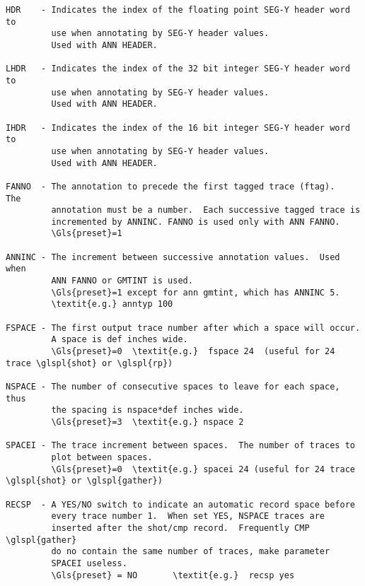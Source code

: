 \begin{verbatim}
HDR    - Indicates the index of the floating point SEG-Y header word to
         use when annotating by SEG-Y header values.
         Used with ANN HEADER.

LHDR   - Indicates the index of the 32 bit integer SEG-Y header word to
         use when annotating by SEG-Y header values.
         Used with ANN HEADER.

IHDR   - Indicates the index of the 16 bit integer SEG-Y header word to
         use when annotating by SEG-Y header values.
         Used with ANN HEADER.

FANNO  - The annotation to precede the first tagged trace (ftag).   The
         annotation must be a number.  Each successive tagged trace is
         incremented by ANNINC. FANNO is used only with ANN FANNO.
         \Gls{preset}=1

ANNINC - The increment between successive annotation values.  Used when
         ANN FANNO or GMTINT is used.
         \Gls{preset}=1 except for ann gmtint, which has ANNINC 5.
         \textit{e.g.} anntyp 100

FSPACE - The first output trace number after which a space will occur.
         A space is def inches wide.
         \Gls{preset}=0  \textit{e.g.}  fspace 24  (useful for 24 trace \glspl{shot} or \glspl{rp})

NSPACE - The number of consecutive spaces to leave for each space, thus
         the spacing is nspace*def inches wide.
         \Gls{preset}=3  \textit{e.g.} nspace 2

SPACEI - The trace increment between spaces.  The number of traces to
         plot between spaces.
         \Gls{preset}=0  \textit{e.g.} spacei 24 (useful for 24 trace \glspl{shot} or \glspl{gather})

RECSP  - A YES/NO switch to indicate an automatic record space before
         every trace number 1.  When set YES, NSPACE traces are
         inserted after the shot/cmp record.  Frequently CMP \glspl{gather}
         do no contain the same number of traces, make parameter
         SPACEI useless.
         \Gls{preset} = NO       \textit{e.g.}  recsp yes


\end{verbatim}
